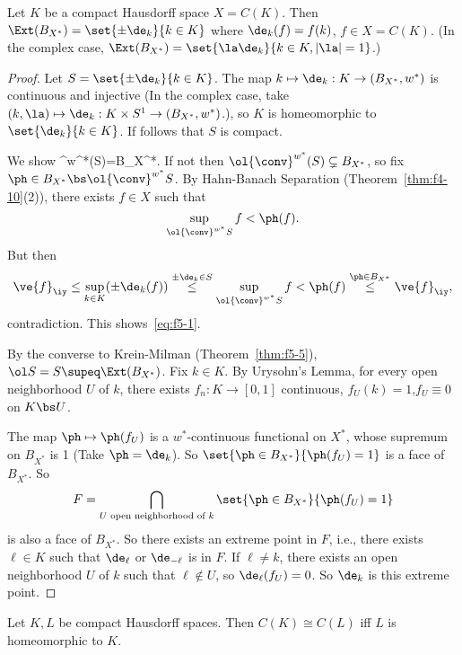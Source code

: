 \begin{pr}
Let $K$ be a compact Hausdorff space $X=C(K)$. Then $\Ext(B_{X^*}) = \set{\pm \de_k}{k\in K}$ where $\de_k(f)=f(k)$, $f\in X=C(K)$. (In the complex case, $\Ext(B_{X^*})=\set{\la \de_k}{k\in K,|\la|=1}$.)
\end{pr}
\begin{proof}
Let $S=\set{\pm \de_k}{k\in K}$. The map $k\mapsto \de_k:K\to (B_{X^*},w^*)$ is continuous and injective (In the complex case, take $(k,\la)\mapsto \de_k:K\times S^1\to (B_{X^*},w^*)$.), so $K$ is homeomorphic to $\set{\de_k}{k\in K}$. If follows that $S$ is compact.

We show 
\ol{\conv}^{w^*}(S)=B_{X^*}.\eeq
 If not then $\ol{\conv}^{w^*}(S)\subsetneq B_{X^*}$, so fix $\ph\in B_{X^*}\bs \ol{\conv}^{w^*} S$. 
By Hahn-Banach Separation (Theorem~\ref{thm:f4-10}(2)), there exists $f\in X$ such that 
\[
\sup_{\ol{\conv}^{w^*}S}f<\ph(f).\]
But then
\[
\ve{f}_{\iy}\le  \sup_{k\in K} (\pm \de_k(f))\stackrel{\pm\de_k\in S}{\le}\sup_{\ol{\conv}^{w^*}S}f< \ph(f)\stackrel{\ph\in B_{X^*}}{\le} \ve{f}_{\iy},
\]
contradiction. This shows~\ref{eq:f5-1}.

By the converse to Krein-Milman (Theorem~\ref{thm:f5-5}), $\ol S=S\supeq \Ext(B_{X^*})$. Fix $k\in K$. By Urysohn's Lemma, for every open neighborhood $U$ of $k$, there exists $f_n:K\to [0,1]$ continuous, $f_U(k)=1$,$f_U\equiv 0$ on $K\bs U$.

The map $\ph\mapsto \ph(f_U)$ is a $w^*$-continuous functional on $X^*$, whose supremum on $B_{X^*}$ is 1 (Take $\ph=\de_k$). So $\set{\ph\in B_{X^*}}{\ph(f_U)=1}$ is a face of $B_{X^*}$. So 
\[F=\bigcap_{U\text{ open neighborhood of }k} \set{\ph\in B_{X^*}}{\ph(f_U)=1}\]
is also a face of $B_{X^*}$. So there exists an extreme point in $F$, i.e., there exists $\ell\in K$ such that $\de_{\ell}$ or $\de_{-\ell}$ is in $F$. If $\ell\ne k$, there exists an open neighborhood $U$ of $k$ such that $\ell\nin U$, so $\de_{\ell}(f_U)=0$. So $\de_k$ is this extreme point. %
\end{proof}
\begin{thm}
Let $K,L$ be compact Hausdorff spaces. Then $C(K)\cong C(L)$ iff $L$ is homeomorphic to $K$.
\end{thm}
